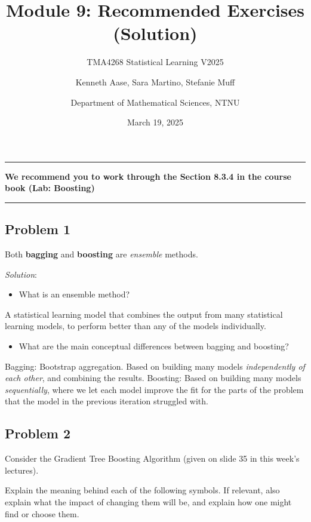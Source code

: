 \documentclass[
]{article}
\title{Module 9: Recommended Exercises (Solution)}
\subtitle{TMA4268 Statistical Learning V2025}
\author{Kenneth Aase, Sara Martino, Stefanie Muff \and Department of
Mathematical Sciences, NTNU}
\date{March 19, 2025}
\providecommand{\tightlist}{%
  \setlength{\itemsep}{0pt}\setlength{\parskip}{0pt}}
\begin{document}
\maketitle

\begin{center}\rule{0.5\linewidth}{0.5pt}\end{center}

\textbf{We recommend you to work through the Section 8.3.4 in the course
book (Lab: Boosting)}

\begin{center}\rule{0.5\linewidth}{0.5pt}\end{center}

\subsection{Problem 1}\label{problem-1}

Both \textbf{bagging} and \textbf{boosting} are \emph{ensemble} methods.

\emph{Solution}:

\begin{itemize}
\tightlist
\item
  What is an ensemble method?
\end{itemize}

A statistical learning model that combines the output from many
statistical learning models, to perform better than any of the models
individually.

\begin{itemize}
\tightlist
\item
  What are the main conceptual differences between bagging and boosting?
\end{itemize}

Bagging: Bootstrap aggregation. Based on building many models
\emph{independently of each other}, and combining the results. Boosting:
Based on building many models \emph{sequentially}, where we let each
model improve the fit for the parts of the problem that the model in the
previous iteration struggled with.

\subsection{Problem 2}\label{problem-2}

Consider the Gradient Tree Boosting Algorithm (given on slide 35 in this
week's lectures).

Explain the meaning behind each of the following symbols. If relevant,
also explain what the impact of changing them will be, and explain how
one might find or choose them.
\end{document}
